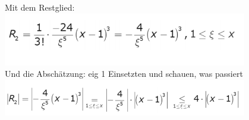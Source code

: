 \documentclass[12pt,a4paper]{article}
\begin{document}
Mit dem Restglied:\\
\includegraphics[width=0.8\textwidth]{Bilder/V1/27.png}\\
Und die Abschätzung: eig 1 Einsetzten und schauen, was passiert\\
\includegraphics[width=0.8\textwidth]{Bilder/V1/28.png}\\
\newpage
\end{document}
